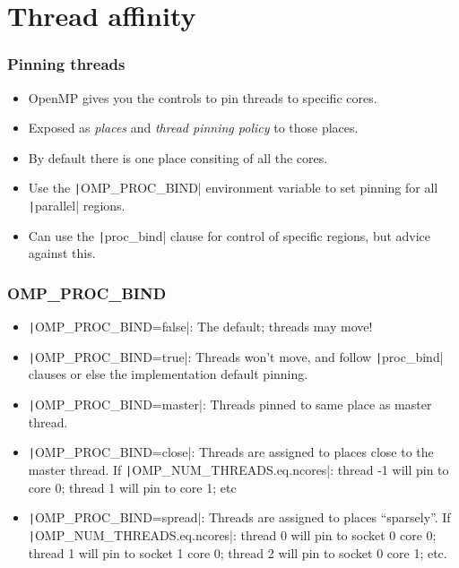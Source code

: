 \documentclass{beamer}
\begin{document}
\section{Thread affinity}
\begin{frame}
\frametitle{Pinning threads}
\begin{itemize}
  \item OpenMP gives you the controls to pin threads to specific cores.
  \item Exposed as \emph{places} and \emph{thread pinning policy} to those places.
  \item By default there is one place consiting of all the cores.
  \item Use the \texttt|OMP_PROC_BIND| environment variable to set pinning for all \texttt|parallel| regions.
  \item Can use the \texttt|proc_bind| clause for control of specific regions, but advice against this.
\end{itemize}
\end{frame}

\begin{frame}
\frametitle{OMP\_PROC\_BIND}
\begin{itemize}
  \item \texttt|OMP_PROC_BIND=false|: The default; threads may move!
  \item \texttt|OMP_PROC_BIND=true|: Threads won't move, and follow \texttt|proc_bind| clauses or else the implementation default pinning.
  \item \texttt|OMP_PROC_BIND=master|: Threads pinned to same place as master thread.
  \item \texttt|OMP_PROC_BIND=close|: Threads are assigned to places close to the master thread.
  If \texttt|OMP_NUM_THREADS.eq.ncores|: thread -1 will pin to core 0; thread 1 will pin to core 1; etc
  \item \texttt|OMP_PROC_BIND=spread|: Threads are assigned to places ``sparsely''.
  If \texttt|OMP_NUM_THREADS.eq.ncores|: thread 0 will pin to socket 0 core 0; thread 1 will pin to socket 1 core 0; thread 2 will pin to socket 0 core 1; etc.
\end{itemize}
\end{frame}
\end{document}
